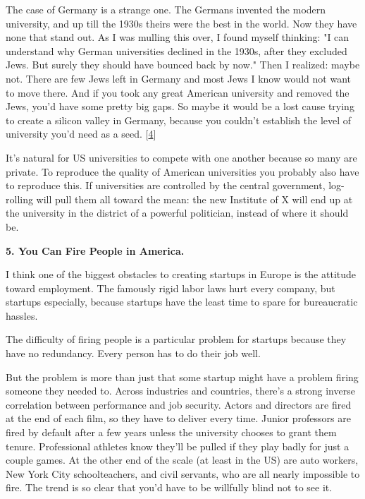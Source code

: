 The
                  case of Germany is a strange one. The Germans invented the
                  modern university, and up till the 1930s theirs were the best
                  in the world. Now they have none that stand out. As I was
                  mulling this over, I found myself thinking: "I can understand
                  why German universities declined in the 1930s, after they
                  excluded Jews. But surely they should have bounced back by
                  now." Then I realized: maybe not. There are few Jews left in
                  Germany and most Jews I know would not want to move there. And
                  if you took any great American university and removed the
                  Jews, you'd have some pretty big gaps. So maybe it would be a
                  lost cause trying to create a silicon valley in Germany,
                  because you couldn't establish the level of university you'd
                  need as a seed.
                  [\href{\#f4n}{4}]

It's natural for US universities to compete with
                  one another because so many are private. To reproduce the
                  quality of American universities you probably also have to
                  reproduce this. If universities are controlled by the central
                  government, log-rolling will pull them all toward the mean:
                  the new Institute of X will end up at the university in the
                  district of a powerful politician, instead of where it should
                  be.

\textbf{5. You Can Fire People in America.}

I think one of the biggest obstacles to creating
                  startups in Europe is the attitude toward employment. The
                  famously rigid labor laws hurt every company, but startups
                  especially, because startups have the least time to spare for
                  bureaucratic hassles.

The difficulty of firing
                  people is a particular problem for startups because they have
                  no redundancy. Every person has to do their job well.

But
                  the problem is more than just that some startup might have a
                  problem firing someone they needed to. Across industries and
                  countries, there's a strong inverse correlation between
                  performance and job security. Actors and directors are fired
                  at the end of each film, so they have to deliver every time.
                  Junior professors are fired by default after a few years
                  unless the university chooses to grant them tenure.
                  Professional athletes know they'll be pulled if they play
                  badly for just a couple games. At the other end of the scale
                  (at least in the US) are auto workers, New York City
                  schoolteachers, and civil servants, who are all nearly
                  impossible to fire. The trend is so clear that you'd have to
                  be willfully blind not to see it.

